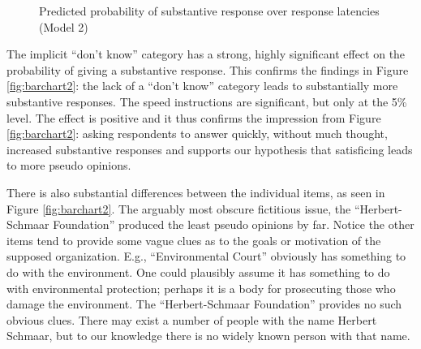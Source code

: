 \documentclass[Royal,times,sageh]{sagej}
\begin{document}
\begin{figure}
\caption{\label{fig:rl-plot2}Predicted probability of substantive response over response latencies (Model 2)}\label{fig:unnamed-chunk-7}
\end{figure}

The implicit ``don't know'' category has a strong, highly significant
effect on the probability of giving a substantive response. This
confirms the findings in Figure \ref{fig:barchart2}: the lack of a
``don't know'' category leads to substantially more substantive
responses. The speed instructions are significant, but only at the 5\%
level. The effect is positive and it thus confirms the impression from
Figure \ref{fig:barchart2}: asking respondents to answer quickly,
without much thought, increased substantive responses and supports our
hypothesis that satisficing leads to more pseudo opinions.

There is also substantial differences between the individual items, as
seen in Figure \ref{fig:barchart2}. The arguably most obscure fictitious
issue, the ``Herbert-Schmaar Foundation'' produced the least pseudo
opinions by far. Notice the other items tend to provide some vague clues
as to the goals or motivation of the supposed organization. E.g.,
``Environmental Court'' obviously has something to do with the
environment. One could plausibly assume it has something to do with
environmental protection; perhaps it is a body for prosecuting those who
damage the environment. The ``Herbert-Schmaar Foundation'' provides no
such obvious clues. There may exist a number of people with the name
Herbert Schmaar, but to our knowledge there is no widely known person
with that name.
\end{document}
